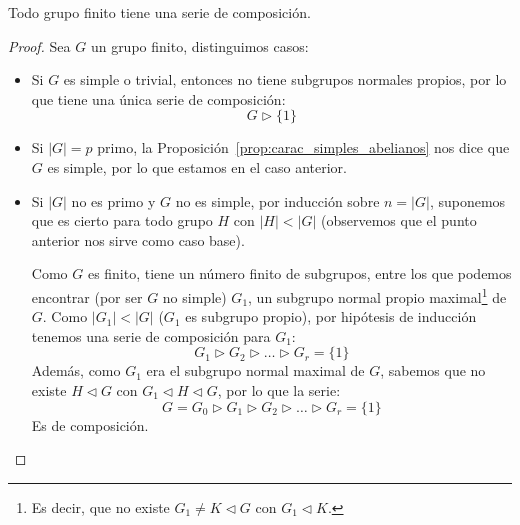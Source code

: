 \begin{prop}
    Todo grupo finito tiene una serie de composición.
    \begin{proof}
        Sea $G$ un grupo finito, distinguimos casos:
        \begin{itemize}
            \item Si $G$ es simple o trivial, entonces no tiene subgrupos normales propios, por lo que tiene una única serie de composición:
                \begin{equation*}
                    G \rhd \{1\}
                \end{equation*}
            \item Si $|G| = p$ primo, la Proposición~\ref{prop:carac_simples_abelianos} nos dice que $G$ es simple, por lo que estamos en el caso anterior.
            \item Si $|G|$ no es primo y $G$ no es simple, por inducción sobre $n = |G|$, suponemos que es cierto para todo grupo $H$ con $|H|<|G|$ (observemos que el punto anterior nos sirve como caso base).

                Como $G$ es finito, tiene un número finito de subgrupos, entre los que podemos encontrar (por ser $G$ no simple) $G_1$, un subgrupo normal propio maximal\footnote{Es decir, que no existe $G_1 \neq K\lhd G$ con $G_1 \lhd  K$.} de $G$. Como $|G_1| < |G|$ ($G_1$ es subgrupo propio), por hipótesis de inducción tenemos una serie de composición para $G_1$:
                \begin{equation*}
                    G_1 \rhd G_2 \rhd \ldots \rhd G_r = \{1\}
                \end{equation*}
                Además, como $G_1$ era el subgrupo normal maximal de $G$, sabemos que no existe $H\lhd G$ con $G_1 \lhd H \lhd G$, por lo que la serie:
                \begin{equation*}
                    G = G_0 \rhd G_1 \rhd G_2 \rhd \ldots \rhd G_r = \{1\}
                \end{equation*}
                Es de composición. \qedhere
        \end{itemize}
    \end{proof}
\end{prop}

